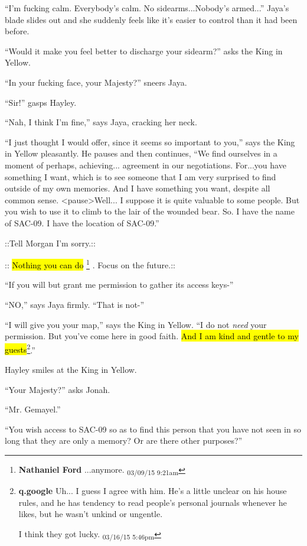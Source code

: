 ``I'm fucking calm. Everybody's calm.  No sidearms...Nobody's armed...'' Jaya's blade slides out and she suddenly feels like it's easier to control than it had been before.

``Would it make you feel better to discharge your sidearm?'' asks the King in Yellow.

``In your fucking face, your Majesty?'' sneers Jaya.

``Sir!'' gasps Hayley.

``Nah, I think I'm fine,'' says Jaya, cracking her neck.

``I just thought I would offer, since it seems so important to you,'' says the King in Yellow pleasantly.   He pauses and then continues, ``We find ourselves in a moment of perhaps, achieving... agreement in our negotiations.  For...you have something I want, which is to see someone that I am very surprised to find outside of my own memories.  And I have something you want, despite all common sense.  \textless pause\textgreater  Well... I suppose it is quite valuable to some people.  But you wish to use it to climb to the lair of the wounded bear.  So.  I have the name of SAC-09.  I have the location of SAC-09.''

 {\color[RGB]{255,0,0}::Tell Morgan I'm sorry.::} 

 {\color[RGB]{74,134,232}::}  {\color[RGB]{74,134,232}\hl{Nothing you can do}} \footnote{\textbf{Nathaniel Ford }...anymore. \textsubscript{03/09/15 9:21am}} {\color[RGB]{74,134,232}.  Focus on the future.::} 

``If you will but grant me permission to gather its access keys-''

``NO,'' says Jaya firmly.  ``That is not-''

``I will give you your map,'' says the King in Yellow.  ``I do not \textit{need }your permission.  But you've come here in good faith.  \hl{And I am kind and gentle to my guests}\footnote{\textbf{q.google }Uh... I guess I agree with him.  He's a little unclear on his house rules, and he has tendency to read people's personal journals whenever he likes, but he wasn't unkind or ungentle.

I think they got lucky. \textsubscript{03/16/15 5:46pm}}.''

Hayley smiles at the King in Yellow.

``Your Majesty?'' asks Jonah.

``Mr. Gemayel.''

``You wish access to SAC-09 so as to find this person that you have not seen in so long that they are only a memory?  Or are there other purposes?''

